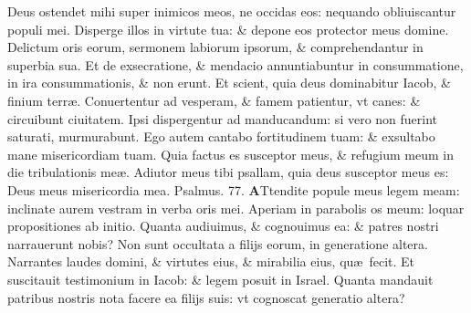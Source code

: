\documentclass[a5paper,10pt]{book}
\def\ae{æ}
\begin{document}
\begin{multicols*}{2}
\newline \color{red} D\color{black}eus ostendet mihi super inimicos meos, ne occidas eos: nequando obliuiscantur populi mei.
\newline \color{red} D\color{black}isperge illos in virtute tua: \& depone eos protector meus domine.
\newline \color{red} D\color{black}elictum oris eorum, sermonem labiorum ipsorum, \& comprehendantur in superbia sua.
\newline \color{red} E\color{black}t de exsecratione, \& mendacio annuntiabuntur in consummatione, in ira consummationis, \& non erunt.
\newline \color{red} E\color{black}t scient, quia deus dominabitur Iacob, \& finium terr\ae .
\newline \color{red} C\color{black}onuertentur ad vesperam, \& famem patientur, vt canes: \& circuibunt ciuitatem.
\newline \color{red} I\color{black}psi dispergentur ad manducandum: si vero non fuerint saturati, murmurabunt.%
\newline \color{red} E\color{black}go autem cantabo fortitudinem tuam: \& exsultabo mane misericordiam tuam.
\newline \color{red} Q\color{black}uia factus es susceptor meus, \& refugium meum in die tribulationis me\ae .
\newline \color{red} A\color{black}diutor meus tibi psallam, quia deus susceptor meus es: Deus meus misericordia mea. \quad \color{red} Psalmus. 77. \color{black}
\vspace{-.5em}
\lettrine[lines=2]{\bfseries \color{red} A}{}Ttendite popule meus legem meam: inclinate aurem vestram in verba oris mei.
\newline \color{red} A\color{black}periam in parabolis os meum: loquar propositiones ab initio.
\newline \color{red} Q\color{black}uanta audiuimus, \& cognouimus ea: \& patres nostri narrauerunt nobis?
\newline \color{red} N\color{black}on sunt occultata a filijs eorum, in generatione altera.
\newline \color{red} N\color{black}arrantes laudes domini, \& virtutes eius, \& mirabilia eius, qu\ae \ fecit.
\newline \color{red} E\color{black}t suscitauit testimonium in Iacob: \& legem posuit in Israel.
\newline \color{red} Q\color{black}uanta mandauit patribus nostris nota facere ea filijs suis: vt cognoscat generatio altera?

\end{multicols*}
\end{document}
